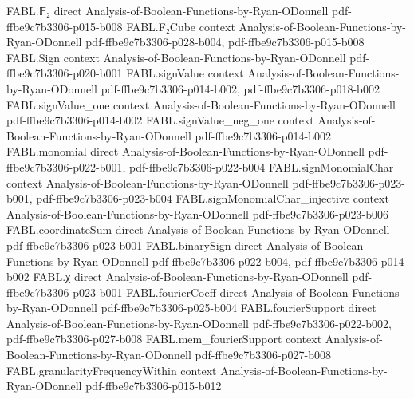 \begin{theorem}
\leanok
{}
\proofstep
  {FABL.𝔽₂}
  {direct}
  {Analysis-of-Boolean-Functions-by-Ryan-ODonnell}
  {pdf-ffbe9c7b3306-p015-b008}
\proofstep
  {FABL.F₂Cube}
  {context}
  {Analysis-of-Boolean-Functions-by-Ryan-ODonnell}
  {pdf-ffbe9c7b3306-p028-b004,
    pdf-ffbe9c7b3306-p015-b008}
\proofstep
  {FABL.Sign}
  {context}
  {Analysis-of-Boolean-Functions-by-Ryan-ODonnell}
  {pdf-ffbe9c7b3306-p020-b001}
\proofstep
  {FABL.signValue}
  {context}
  {Analysis-of-Boolean-Functions-by-Ryan-ODonnell}
  {pdf-ffbe9c7b3306-p014-b002,
    pdf-ffbe9c7b3306-p018-b002}
\proofstep
  {FABL.signValue_one}
  {context}
  {Analysis-of-Boolean-Functions-by-Ryan-ODonnell}
  {pdf-ffbe9c7b3306-p014-b002}
\proofstep
  {FABL.signValue_neg_one}
  {context}
  {Analysis-of-Boolean-Functions-by-Ryan-ODonnell}
  {pdf-ffbe9c7b3306-p014-b002}
\proofstep
  {FABL.monomial}
  {direct}
  {Analysis-of-Boolean-Functions-by-Ryan-ODonnell}
  {pdf-ffbe9c7b3306-p022-b001,
    pdf-ffbe9c7b3306-p022-b004}
\proofstep
  {FABL.signMonomialChar}
  {context}
  {Analysis-of-Boolean-Functions-by-Ryan-ODonnell}
  {pdf-ffbe9c7b3306-p023-b001,
    pdf-ffbe9c7b3306-p023-b004}
\proofstep
  {FABL.signMonomialChar_injective}
  {context}
  {Analysis-of-Boolean-Functions-by-Ryan-ODonnell}
  {pdf-ffbe9c7b3306-p023-b006}
\proofstep
  {FABL.coordinateSum}
  {direct}
  {Analysis-of-Boolean-Functions-by-Ryan-ODonnell}
  {pdf-ffbe9c7b3306-p023-b001}
\proofstep
  {FABL.binarySign}
  {direct}
  {Analysis-of-Boolean-Functions-by-Ryan-ODonnell}
  {pdf-ffbe9c7b3306-p022-b004,
    pdf-ffbe9c7b3306-p014-b002}
\proofstep
  {FABL.χ}
  {direct}
  {Analysis-of-Boolean-Functions-by-Ryan-ODonnell}
  {pdf-ffbe9c7b3306-p023-b001}
\proofstep
  {FABL.fourierCoeff}
  {direct}
  {Analysis-of-Boolean-Functions-by-Ryan-ODonnell}
  {pdf-ffbe9c7b3306-p025-b004}
\proofstep
  {FABL.fourierSupport}
  {direct}
  {Analysis-of-Boolean-Functions-by-Ryan-ODonnell}
  {pdf-ffbe9c7b3306-p022-b002,
    pdf-ffbe9c7b3306-p027-b008}
\proofstep
  {FABL.mem_fourierSupport}
  {context}
  {Analysis-of-Boolean-Functions-by-Ryan-ODonnell}
  {pdf-ffbe9c7b3306-p027-b008}
\proofstep
  {FABL.granularityFrequencyWithin}
  {context}
  {Analysis-of-Boolean-Functions-by-Ryan-ODonnell}
  {pdf-ffbe9c7b3306-p015-b012}
\proofstep

\end{theorem}
